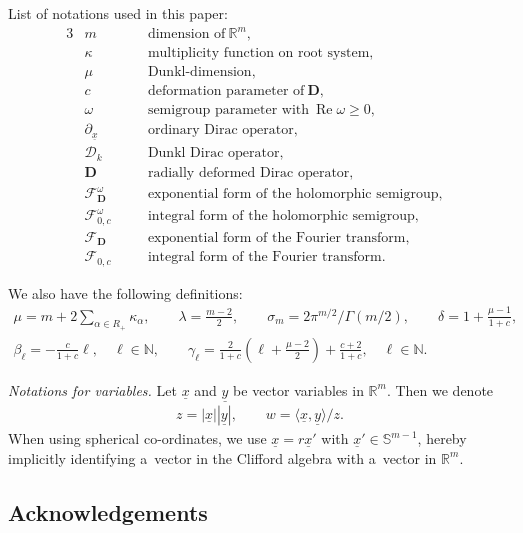 \documentclass[pdftex]{sigma}
\numberwithin{equation}{section}
\numberwithin{theorem}{section}
\numberwithin{proposition}{section}
\numberwithin{lemma}{section}
\numberwithin{corollary}{section}
\numberwithin{definition}{section}
\numberwithin{example}{section}
\numberwithin{remark}{section}
\numberwithin{note}{section}
\theoremstyle{remark}
\newcommand{\mR}{\mathbb{R}}
\newcommand{\mN}{\mathbb{N}}
\newcommand{\mS}{\mathbb{S}}
\newcommand{\cD}{\mathcal{D}}
\newcommand{\cF}{\mathcal{F}}
\newcommand{\dD}{\textbf{D}}
\newcommand{\ux}{\underline{x}}
\newcommand{\uy}{\underline{y}}
\newcommand{\upx}{\partial_{\underline{x}}}
\def\k{{\kappa}}
\def\l{{\lambda}}
\def\o{{\omega}}
\def\la{{\langle}}
\def\ra{{\rangle}}
\begin{document}
List of notations used in this paper:
\begin{alignat*}{3}
& m\quad &&\text{dimension of} \ \mR^{m},& \\
& \k \quad &&\text{multiplicity function on root system},& \\
& \mu\quad &&\text{Dunkl-dimension},& \\
& c\quad &&\text{deformation parameter of} \ \dD, & \\
& \o \quad &&\text{semigroup parameter with} \ \operatorname{Re}{\o}\geq0,& \\
& \upx \quad &&\text{ordinary Dirac operator},& \\
& \cD_{k} \quad &&\text{Dunkl Dirac operator},& \\
& \dD\quad &&\text{radially deformed Dirac operator},& \\
& \cF_{\dD}^{\o}\quad &&\text{exponential form of the holomorphic semigroup},& \\
& \cF_{0,c}^{\o}\quad &&\text{integral form of the holomorphic semigroup},& \\
& \cF_{\dD}\quad &&\text{exponential form of the Fourier transform},& \\
& \cF_{0,c}\quad &&\text{integral form of the Fourier transform}. &
\end{alignat*}

We also have the following def\/initions:
\begin{gather*}
\mu = m + 2 \sum_{\alpha \in R_+} \k_{\alpha},\qquad
\l = \frac{m-2}{2},\qquad
\sigma_{m} = 2 \pi^{m/2}/\Gamma(m/2),\qquad
\delta  = 1 + \frac{\mu-1}{1+c},\\
\beta_{\ell} = - \frac{c}{1+c}\ell, \quad \ell \in \mN,\qquad
\gamma_{\ell} = \frac{2}{1+c}\left( \ell + \frac{\mu-2}{2}\right) + \frac{c+2}{1+c}, \quad \ell
\in \mN.
\end{gather*}

\emph{Notations for variables.} Let $\ux$ and $\uy$ be vector variables in $\mR^{m}$.
Then we denote
\begin{gather*}
z = |\ux| |\uy|,\qquad
w  = \la \ux, \uy \ra /z.
\end{gather*}
When using spherical co-ordinates, we use $\ux=r\ux'$ with $\ux'\in\mS^{m-1}$, hereby
implicitly identifying a~vector in the Clif\/ford algebra with a~vector in $\mR^{m}$.

\subsection*{Acknowledgements}
\end{document}
